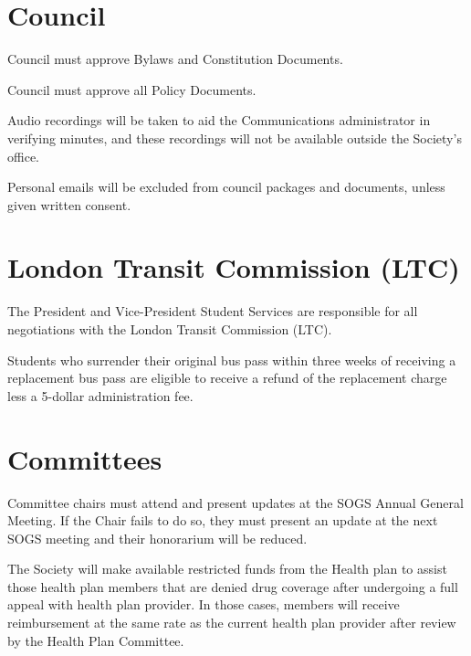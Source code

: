 \section{Council}
\begin{longenum}[ label*=\thesection.\arabic*., align=left]
\item Council must approve Bylaws and Constitution Documents.
\item Council must approve all Policy Documents.
\item Audio recordings will be taken to aid the Communications administrator in verifying minutes, and these recordings will not be available outside the Society’s office.
\item Personal emails will be excluded from council packages and documents, unless given written consent.
\end{longenum}

\section{London Transit Commission (LTC)}
\begin{longenum}[ label*=\thesection.\arabic*., align=left]
\item The President and Vice-President Student Services are responsible for all negotiations with the London Transit Commission (LTC).
\item Students who surrender their original bus pass within three weeks of receiving a replacement bus pass are eligible to receive a refund of the replacement charge less a 5-dollar administration fee.
\end{longenum}

\section{Committees}
\begin{longenum}[ label*=\thesection.\arabic*., align=left]
\item Committee chairs must attend and present updates at the SOGS Annual General Meeting. If the Chair fails to do so, they must present an update at the next SOGS meeting and their honorarium will be reduced.
\item The Society will make available restricted funds from the Health plan to assist those health plan members that are denied drug coverage after undergoing a full appeal with health plan provider. In those cases, members will receive reimbursement at the same rate as the current health plan provider after review by the Health Plan Committee.
\end{longenum}

